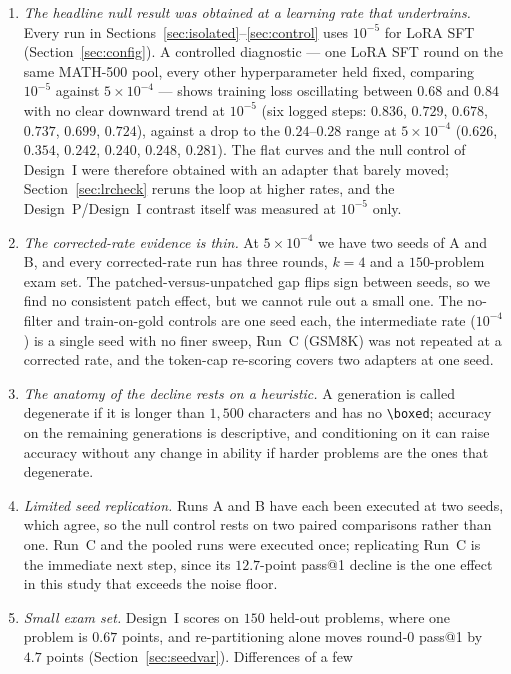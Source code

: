\documentclass[runningheads]{llncs}
\begin{document}
\begin{enumerate}
\item \emph{The headline null result was obtained at a learning rate that undertrains.}
Every run in Sections~\ref{sec:isolated}--\ref{sec:control} uses $10^{-5}$ for
LoRA SFT (Section~\ref{sec:config}). A controlled diagnostic --- one LoRA SFT
round on the same MATH-500 pool, every other hyperparameter held fixed,
comparing $10^{-5}$ against $5\times10^{-4}$ --- shows training loss
oscillating between $0.68$ and $0.84$ with no clear downward trend at
$10^{-5}$ (six logged steps: $0.836$, $0.729$, $0.678$, $0.737$, $0.699$,
$0.724$), against a drop to the $0.24$--$0.28$ range at $5\times10^{-4}$
($0.626$, $0.354$, $0.242$, $0.240$, $0.248$, $0.281$). The flat curves
and the null control of Design~I were therefore obtained with an adapter that
barely moved; Section~\ref{sec:lrcheck} reruns the loop at higher rates, and
the Design~P/Design~I contrast itself was measured at $10^{-5}$ only.
\item \emph{The corrected-rate evidence is thin.} At $5\times10^{-4}$ we have
two seeds of A and B, and every corrected-rate run has three rounds, $k=4$ and a
$150$-problem exam set. The patched-versus-unpatched gap flips sign between
seeds, so we find no consistent patch effect, but we cannot rule out a small
one. The no-filter and train-on-gold controls are one seed each, the
intermediate rate ($10^{-4}$) is a single seed with no finer sweep, Run~C
(GSM8K) was not repeated at a corrected rate, and the token-cap re-scoring
covers two adapters at one seed.
\item \emph{The anatomy of the decline rests on a heuristic.} A generation is
called degenerate if it is longer than $1{,}500$ characters and has no
\verb|\boxed|; accuracy on the remaining generations is descriptive, and
conditioning on it can raise accuracy without any change in ability if harder
problems are the ones that degenerate.
\item \emph{Limited seed replication.} Runs A and B have each been executed
at two seeds, which agree, so the null control rests on two paired
comparisons rather than one. Run~C and the pooled runs were executed once;
replicating Run~C is the immediate next step, since its $12.7$-point pass@1
decline is the one effect in this study that exceeds the noise floor.
\item \emph{Small exam set.} Design~I scores on $150$ held-out problems,
where one problem is $0.67$ points, and re-partitioning alone moves round-0
pass@1 by $4.7$ points (Section~\ref{sec:seedvar}). Differences of a few

\end{enumerate}
\end{document}
